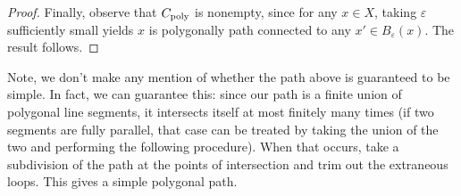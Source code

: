 \begin{proof}
  Finally, observe that $C_{\rm poly}$ is nonempty, since for any $x
  \in X$, taking $\varepsilon$ sufficiently small yields $x$ is
  polygonally path connected to any $x' \in B_{\varepsilon}(x)$. The
  result follows.
\end{proof}
\begin{remark}
  Note, we don't make any mention of whether the path above is
  guaranteed to be simple. In fact, we can guarantee this: since our
  path is a finite union of polygonal line segments, it intersects
  itself at most finitely many times (if two segments are fully
  parallel, that case can be treated by taking the union of the two
  and performing the following procedure). When that occurs, take a
  subdivision of the path at the points of intersection and trim out
  the extraneous loops. This gives a simple polygonal path.
\end{remark}






